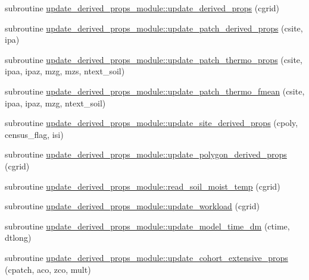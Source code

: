 \begin{DoxyCompactItemize}
\item 
subroutine \hyperlink{namespaceupdate__derived__props__module_a661a2afd35ef64573ff9be7d88ef2d02}{update\+\_\+derived\+\_\+props\+\_\+module\+::update\+\_\+derived\+\_\+props} (cgrid)
\item 
subroutine \hyperlink{namespaceupdate__derived__props__module_afb0be8a22ce7ffce3fa96d10c2ee6408}{update\+\_\+derived\+\_\+props\+\_\+module\+::update\+\_\+patch\+\_\+derived\+\_\+props} (csite, ipa)
\item 
subroutine \hyperlink{namespaceupdate__derived__props__module_a304000a1024ed8b1bb99a278f951cd59}{update\+\_\+derived\+\_\+props\+\_\+module\+::update\+\_\+patch\+\_\+thermo\+\_\+props} (csite, ipaa, ipaz, mzg, mzs, ntext\+\_\+soil)
\item 
subroutine \hyperlink{namespaceupdate__derived__props__module_a9ba5c6db0a367e14898de5f053d7cea6}{update\+\_\+derived\+\_\+props\+\_\+module\+::update\+\_\+patch\+\_\+thermo\+\_\+fmean} (csite, ipaa, ipaz, mzg, ntext\+\_\+soil)
\item 
subroutine \hyperlink{namespaceupdate__derived__props__module_acb06a52bb543f1d85d2e0e5c538a9506}{update\+\_\+derived\+\_\+props\+\_\+module\+::update\+\_\+site\+\_\+derived\+\_\+props} (cpoly, census\+\_\+flag, isi)
\item 
subroutine \hyperlink{namespaceupdate__derived__props__module_ae950be2eb03707a8077984fb746de560}{update\+\_\+derived\+\_\+props\+\_\+module\+::update\+\_\+polygon\+\_\+derived\+\_\+props} (cgrid)
\item 
subroutine \hyperlink{namespaceupdate__derived__props__module_a6633a22e580cb59ccb4bbdbad3c25a62}{update\+\_\+derived\+\_\+props\+\_\+module\+::read\+\_\+soil\+\_\+moist\+\_\+temp} (cgrid)
\item 
subroutine \hyperlink{namespaceupdate__derived__props__module_a3500a21831fa2e83c3554428646d3694}{update\+\_\+derived\+\_\+props\+\_\+module\+::update\+\_\+workload} (cgrid)
\item 
subroutine \hyperlink{namespaceupdate__derived__props__module_a151765af41b91155a961768f769fb7aa}{update\+\_\+derived\+\_\+props\+\_\+module\+::update\+\_\+model\+\_\+time\+\_\+dm} (ctime, dtlong)
\item 
subroutine \hyperlink{namespaceupdate__derived__props__module_a32f02a976fa5385f607cb4fa4d1aa552}{update\+\_\+derived\+\_\+props\+\_\+module\+::update\+\_\+cohort\+\_\+extensive\+\_\+props} (cpatch, aco, zco, mult)
\end{DoxyCompactItemize}
